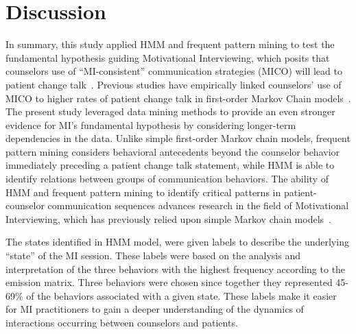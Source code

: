 \section{Discussion}
\label{sec:discussion}
In summary, this study applied HMM and frequent pattern mining to test the fundamental hypothesis guiding Motivational Interviewing, which posits that counselors use of ``MI-consistent'' communication strategies (MICO) will lead to patient change talk~\cite{miller2009toward}. Previous studies have empirically linked counselors’ use of MICO to higher rates of patient change talk in first-order Markov Chain models~\cite{moyers2006therapist, moyers2009session, gaume2010counselor}. The present study leveraged data mining methods to provide an even stronger evidence for MI’s fundamental hypothesis by considering longer-term dependencies in the data. Unlike simple first-order Markov chain models, frequent pattern mining considers behavioral antecedents beyond the counselor behavior immediately preceding a patient change talk statement, while HMM is able to identify relations between groups of communication behaviors. The ability of HMM and frequent pattern mining to identify critical patterns in patient-counselor communication sequences advances research in the field of Motivational Interviewing, which has previously relied upon simple Markov chain models~\cite{moyers2006therapist, moyers2009session, gaume2008counsellor, gaume2010counselor, glynn2014change, carcone2013provider, jacques2016building}.

The states identified in HMM model, were given labels to describe the underlying ``state'' of the MI session. These labels were based on the analysis and interpretation of the three behaviors with the highest frequency according to the emission matrix. Three behaviors were chosen since together they represented 45-69\% of the behaviors associated with a given state. These labels make it easier for MI practitioners to gain a deeper understanding of the dynamics of interactions occurring between counselors and patients. 

